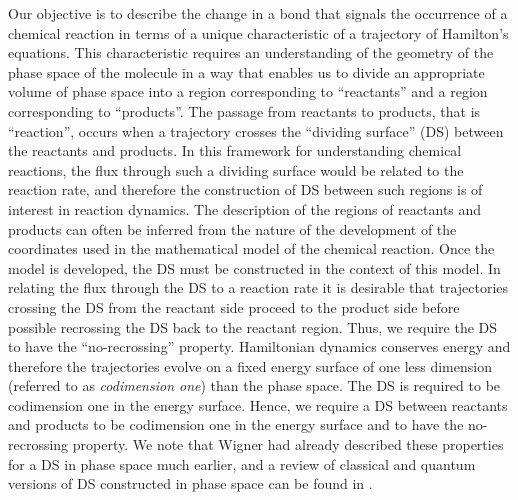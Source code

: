 \documentclass{ws-ijbc}
\begin{document}
Our objective is to describe the change in a bond that signals the occurrence of a chemical reaction in terms of a unique characteristic of a trajectory of Hamilton's equations. This characteristic requires an understanding of the geometry of the phase space of the molecule in a way that enables us to divide an appropriate volume of phase space into a region corresponding to ``reactants'' and a region corresponding to ``products''. The passage from reactants to products, that is ``reaction'', occurs when a trajectory crosses the ``dividing surface'' (DS) between the reactants and products. In this framework for understanding chemical reactions, the flux through such a dividing surface would be related to the reaction rate, and therefore the construction of DS between such regions is of interest in reaction dynamics. The description of the regions of reactants and products can often be inferred from the nature of the development of the coordinates used in the mathematical model of the chemical reaction. Once the model is developed, the DS must be constructed in the context of this model. In relating the flux through the DS to a reaction rate it is desirable that trajectories crossing the DS from the reactant side proceed to the product side before possible recrossing the DS back to the reactant region. Thus, we require the DS to have the ``no-recrossing'' property\cite{MacKay90, waalkens2004direct}.  Hamiltonian dynamics conserves energy and therefore the trajectories evolve on a fixed energy surface of one less dimension (referred to as {\it codimension one}) than the phase space. The DS is required to be codimension one in the energy surface. Hence, we require a DS between reactants and products to be codimension one in the energy surface and to have the no-recrossing property. We note that Wigner had already described these properties for a DS in phase space much earlier\cite{Wigner38, Wigner39}, and a review of classical and quantum versions of DS constructed in phase space can be found in \cite{WaalkensSchubertWiggins08}. 
\end{document}
